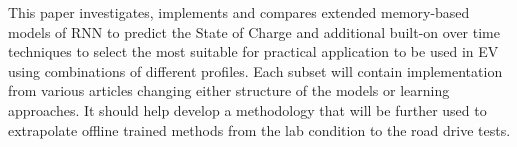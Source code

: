 %
%
%
%
%
This paper investigates, implements and compares extended memory-based models of RNN to predict the State of Charge and additional built-on over time techniques to select the most suitable for practical application to be used in EV using combinations of different profiles.
Each subset will contain implementation from various articles changing either structure of the models or learning approaches.
It should help develop a methodology that will be further used to extrapolate offline trained methods from the lab condition to the road drive tests.

